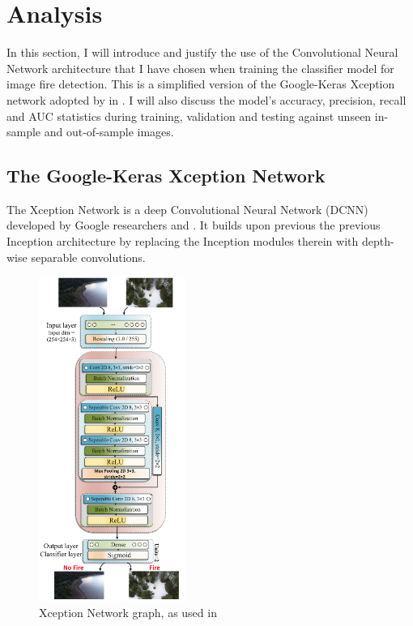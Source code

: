 \documentclass[a4paper,11pt]{article} %
\begin{document}
\section{Analysis}
In this section, I will introduce and justify the use of the Convolutional Neural Network architecture that I have chosen when training the
classifier model for image fire detection. This is a simplified version of the Google-Keras Xception network adopted by  in . I will also discuss the model's accuracy, precision, recall and AUC statistics during training, validation and testing against 
unseen in-sample and out-of-sample images.

\subsection{The Google-Keras Xception Network}
The Xception Network is a deep Convolutional Neural Network (DCNN) developed by Google researchers  \cite{Xception} and  \cite{Szegedy_2016_CVPR,Szegedy_Ioffe_Vanhoucke_Alemi_2017}.
It builds upon previous the previous Inception architecture by replacing the Inception modules therein with depth-wise separable convolutions.

\pagebreak

\begin{figure}
    \begin{center}
        \includegraphics[width=0.43\textwidth]{../figures/Xception_network.png}
    \end{center}
    \caption{Xception Network graph, as used in \cite{FLAME_dataset}}
\end{figure}
\end{document}
